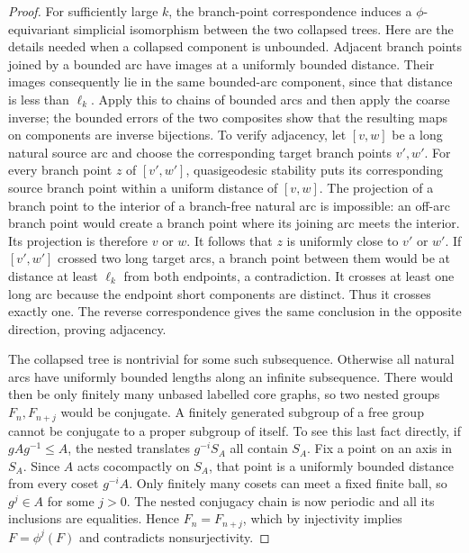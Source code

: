 \begin{proof}
For sufficiently large $k$, the branch-point correspondence induces a
$\phi$-equivariant simplicial isomorphism between the two collapsed
trees. Here are the details needed when a collapsed component is
unbounded. Adjacent branch points joined by a bounded arc have images
at a uniformly bounded distance. Their images consequently lie in the
same bounded-arc component, since that distance is less than $\ell_k$.
Apply this to chains of bounded arcs and then apply the coarse inverse;
the bounded errors of the two composites show that the resulting maps
on components are inverse bijections. To verify adjacency, let $[v,w]$
be a long natural source arc and choose the corresponding target branch
points $v',w'$. For every branch point $z$ of $[v',w']$, quasigeodesic
stability puts its corresponding source branch point within a uniform
distance of $[v,w]$. The projection of a branch point to the interior of
a branch-free natural arc is impossible: an off-arc branch point would
create a branch point where its joining arc meets the interior. Its
projection is therefore $v$ or $w$. It follows that $z$ is uniformly
close to $v'$ or $w'$. If $[v',w']$ crossed two long target arcs, a branch
point between them would be at distance at least $\ell_k$ from both
endpoints, a contradiction. It crosses at least one long arc because
the endpoint short components are distinct. Thus it crosses exactly
one. The reverse correspondence gives the same conclusion in the
opposite direction, proving adjacency.

The collapsed tree is nontrivial for some such subsequence. Otherwise
all natural arcs have uniformly bounded lengths along an infinite
subsequence. There would then be only finitely many unbased labelled
core graphs, so two nested groups $F_n,F_{n+j}$ would be conjugate. A
finitely generated subgroup of a free group cannot be conjugate to a
proper subgroup of itself. To see this last fact directly, if
$gAg^{-1}\le A$, the nested translates $g^{-i}S_A$ all contain $S_A$.
Fix a point on an axis in $S_A$. Since $A$ acts cocompactly on $S_A$,
that point is a uniformly bounded distance from every coset $g^{-i}A$.
Only finitely many cosets can meet a fixed finite ball, so $g^j\in A$
for some $j>0$. The nested conjugacy chain is now periodic and all its
inclusions are equalities. Hence $F_n=F_{n+j}$, which by injectivity
implies $F=\phi^j(F)$ and contradicts nonsurjectivity.


\end{proof}
